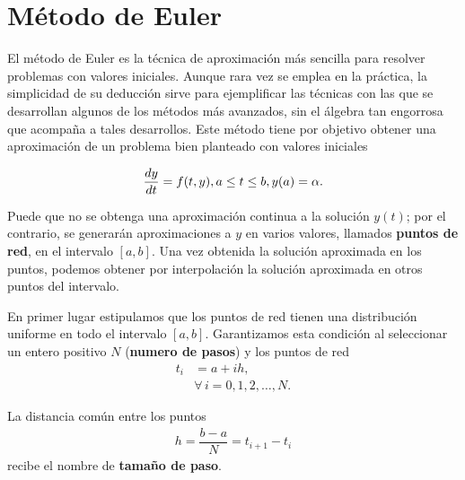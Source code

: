 \section{Método de Euler}
El método de Euler es la técnica de aproximación más sencilla para resolver problemas con valores iniciales. Aunque rara vez 
se emplea en la práctica, la simplicidad de su deducción sirve para ejemplificar las técnicas con las que se desarrollan 
algunos de los métodos más avanzados, sin el álgebra tan engorrosa que acompaña a tales desarrollos.
Este método tiene por objetivo obtener una aproximación de un problema bien planteado con valores iniciales

\begin{equation}
	\dfrac{dy}{dt} = f(t,y), \\ 
	a\leq t\leq b, \\ 
	y(a) = \alpha.
	\label{eq:PVIBienPlanteado}
\end{equation}

Puede que no se obtenga una aproximación continua a la solución $y(t)$; por el contrario, se generarán aproximaciones a $y$ 
en varios valores, llamados \textbf{puntos de red}, en el intervalo $[a,b]$. Una vez obtenida la solución aproximada en los 
puntos, podemos obtener por interpolación la solución aproximada en otros puntos del intervalo.

En primer lugar estipulamos que los puntos de red tienen una distribución uniforme en todo el intervalo $[a,b]$. Garantizamos 
esta condición al seleccionar un entero positivo $N$ (\textbf{numero de pasos}) y los puntos de red
\begin{align*}
	t_i &= a + ih, \\
	&\forall\, i=0,1,2,\dots,N.
\end{align*}

La distancia común entre los puntos 
\begin{align*}
	h=\dfrac{b-a}{N} = t_{i+1}-t_i
\end{align*}
recibe el nombre de \textbf{tamaño de paso}. 

